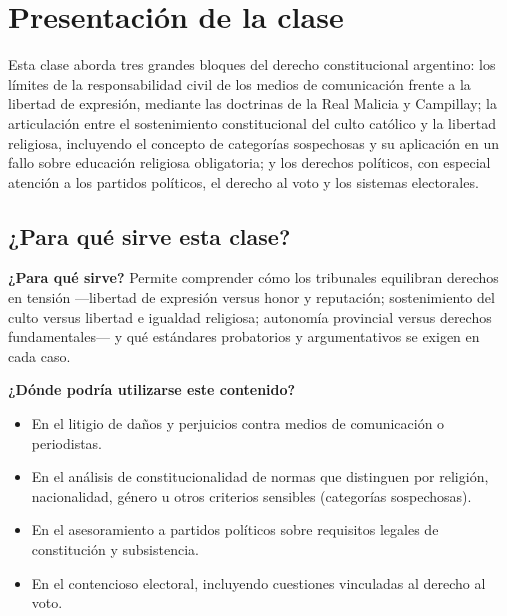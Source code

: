 \documentclass[12pt,oneside]{book}
\begin{document}
\tableofcontents


\chapter*{Presentación de la clase}

Esta clase aborda tres grandes bloques del derecho constitucional argentino: los límites de la responsabilidad civil de los medios de comunicación frente a la libertad de expresión, mediante las doctrinas de la Real Malicia y Campillay; la articulación entre el sostenimiento constitucional del culto católico y la libertad religiosa, incluyendo el concepto de categorías sospechosas y su aplicación en un fallo sobre educación religiosa obligatoria; y los derechos políticos, con especial atención a los partidos políticos, el derecho al voto y los sistemas electorales.

\section*{¿Para qué sirve esta clase?}

\textbf{¿Para qué sirve?} Permite comprender cómo los tribunales equilibran derechos en tensión —libertad de expresión versus honor y reputación; sostenimiento del culto versus libertad e igualdad religiosa; autonomía provincial versus derechos fundamentales— y qué estándares probatorios y argumentativos se exigen en cada caso.

\textbf{¿Dónde podría utilizarse este contenido?}
\begin{itemize}
    \item En el litigio de daños y perjuicios contra medios de comunicación o periodistas.
    \item En el análisis de constitucionalidad de normas que distinguen por religión, nacionalidad, género u otros criterios sensibles (categorías sospechosas).
    \item En el asesoramiento a partidos políticos sobre requisitos legales de constitución y subsistencia.
    \item En el contencioso electoral, incluyendo cuestiones vinculadas al derecho al voto.
\end{itemize}
\end{document}
